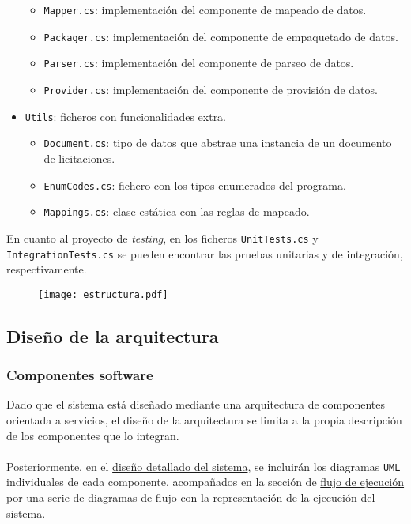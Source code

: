 \begin{itemize}
                \begin{itemize}
                    \item \texttt{Mapper.cs}: implementación del componente de mapeado de datos.
                    \item \texttt{Packager.cs}: implementación del componente de empaquetado de datos.
                    \item \texttt{Parser.cs}: implementación del componente de parseo de datos.
                    \item \texttt{Provider.cs}: implementación del componente de provisión de datos.
                \end{itemize}
            \item \texttt{Utils}: ficheros con funcionalidades extra.
                \begin{itemize}
                    \item \texttt{Document.cs}: tipo de datos que abstrae una instancia de un documento de licitaciones.
                    \item \texttt{EnumCodes.cs}: fichero con los tipos enumerados del programa.
                    \item \texttt{Mappings.cs}: clase estática con las reglas de mapeado.
                \end{itemize}
        \end{itemize}
        
        En cuanto al proyecto de \textit{testing}, en los ficheros \texttt{UnitTests.cs} y \texttt{IntegrationTests.cs} se pueden encontrar las pruebas unitarias y de integración, respectivamente.
        
        \begin{figure}[h]
            \centering
            \texttt{[image: estructura.pdf]}
            \label{fig:estructura}
        \end{figure}
        
    \subsection{Diseño de la arquitectura}
        \subsubsection{Componentes software} \label{subsubsec:componentes}
            Dado que el sistema está diseñado mediante una arquitectura de componentes orientada a servicios, el diseño de la arquitectura se limita a la propia descripción de los componentes que lo integran.
            \\ \\
            Posteriormente, en el \hyperref[subsec:detallado]{diseño detallado del sistema}, se incluirán los diagramas \texttt{UML} individuales de cada componente, acompañados en la sección de \hyperref[subsec:flujo]{flujo de ejecución} por una serie de diagramas de flujo con la representación de la ejecución del sistema.
            
